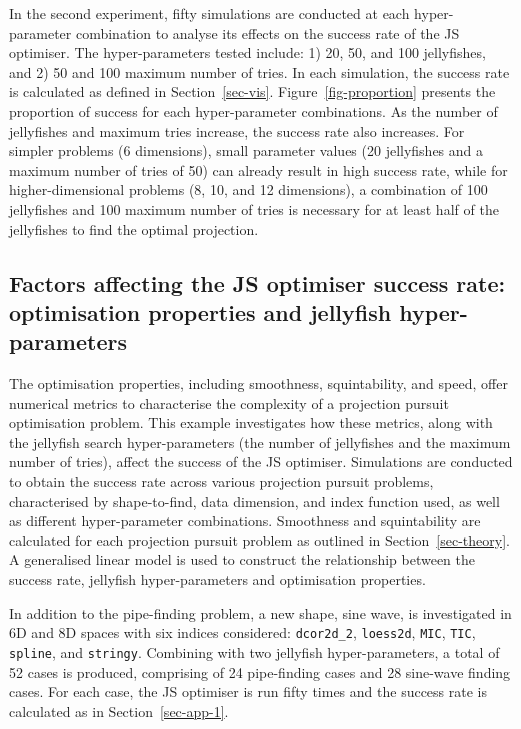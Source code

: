 \documentclass[
  number,
  preprint,
  3p]{elsarticle}
\begin{document}
In the second experiment, fifty simulations are conducted at each
hyper-parameter combination to analyse its effects on the success rate
of the JS optimiser. The hyper-parameters tested include: 1) 20, 50, and
100 jellyfishes, and 2) 50 and 100 maximum number of tries. In each
simulation, the success rate is calculated as defined in
Section~\ref{sec-vis}. Figure~\ref{fig-proportion} presents the
proportion of success for each hyper-parameter combinations. As the
number of jellyfishes and maximum tries increase, the success rate also
increases. For simpler problems (6 dimensions), small parameter values
(20 jellyfishes and a maximum number of tries of 50) can already result
in high success rate, while for higher-dimensional problems (8, 10, and
12 dimensions), a combination of 100 jellyfishes and 100 maximum number
of tries is necessary for at least half of the jellyfishes to find the
optimal projection.

\hypertarget{sec-app-2}{%
\subsection{Factors affecting the JS optimiser success rate:
optimisation properties and jellyfish
hyper-parameters}\label{sec-app-2}}

The optimisation properties, including smoothness, squintability, and
speed, offer numerical metrics to characterise the complexity of a
projection pursuit optimisation problem. This example investigates how
these metrics, along with the jellyfish search hyper-parameters (the
number of jellyfishes and the maximum number of tries), affect the
success of the JS optimiser. Simulations are conducted to obtain the
success rate across various projection pursuit problems, characterised
by shape-to-find, data dimension, and index function used, as well as
different hyper-parameter combinations. Smoothness and squintability are
calculated for each projection pursuit problem as outlined in
Section~\ref{sec-theory}. A generalised linear model is used to
construct the relationship between the success rate, jellyfish
hyper-parameters and optimisation properties.

In addition to the pipe-finding problem, a new shape, sine wave, is
investigated in 6D and 8D spaces with six indices considered:
\texttt{dcor2d\_2}, \texttt{loess2d}, \texttt{MIC}, \texttt{TIC},
\texttt{spline}, and \texttt{stringy}. Combining with two jellyfish
hyper-parameters, a total of 52 cases is produced, comprising of 24
pipe-finding cases and 28 sine-wave finding cases. For each case, the JS
optimiser is run fifty times and the success rate is calculated as in
Section~\ref{sec-app-1}.
\end{document}
